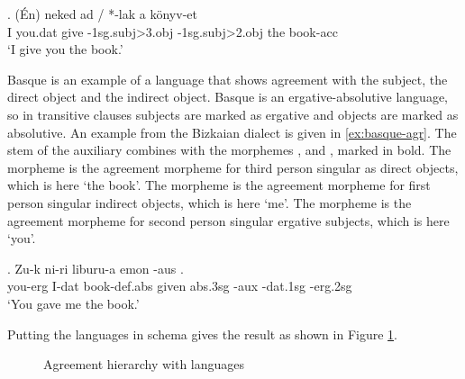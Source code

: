 \exg. (Én) neked ad / *-lak a könyv-et\\
 I you.\ac{dat} give -1\ac{sg}.\ac{subj}>3.\ac{obj} -1\ac{sg}.\ac{subj}>2.\ac{obj} the book-\ac{acc}\\
 `I give you the book.' \label{ex:hungarian-agr}

Basque is an example of a language that shows agreement with the subject, the direct object and the indirect object. Basque is an ergative-absolutive language, so in transitive clauses subjects are marked as ergative and objects are marked as absolutive. An example from the Bizkaian dialect is given in \ref{ex:basque-agr}. The stem of the auxiliary  combines with the morphemes ,  and , marked in bold. The morpheme  is the agreement morpheme for third person singular as direct objects, which is here  `the book'. The morpheme  is the agreement morpheme for first person singular indirect objects, which is here  `me'. The morpheme  is the agreement morpheme for second person singular ergative subjects, which is here  `you'.

\exg. Zu-k ni-ri liburu-a emon  -aus  .\\
 you-\ac{erg} I-\ac{dat} book-\ac{def}.\ac{abs} given \ac{abs}.3\ac{sg} -\ac{aux} -\ac{dat}.1\ac{sg} -\ac{erg}.2\ac{sg}\\
 `You gave me the book.' \label{ex:basque-agr}

Putting the languages in  schema gives the result as shown in Figure \ref{fig:agr-sub-do-io-lang}.

 \begin{figure}[ht]
   \centering
   \caption{Agreement hierarchy with languages}
   \label{fig:agr-sub-do-io-lang}
 \end{figure}

